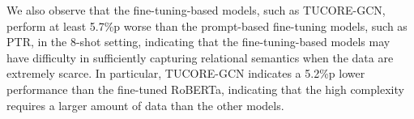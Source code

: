 \documentclass[11pt]{article}
\begin{document}
We also observe that the fine-tuning-based models, such as TUCORE-GCN, perform at least 5.7\%p worse than the prompt-based fine-tuning models, such as PTR, in the 8-shot setting, indicating that the fine-tuning-based models may have difficulty in sufficiently capturing relational semantics when the data are extremely scarce. In particular, TUCORE-GCN indicates a 5.2\%p lower performance than the fine-tuned RoBERTa, indicating that the high complexity requires a larger amount of data than the other models.





\begin{table}[t]
\centering
{}
\caption{
Ablation study on DialogRE dataset. \label{table:grasp_ablation}}
\end{table} \begin{table*}[ht]
\centering
{}
\end{table*}
\end{document}
